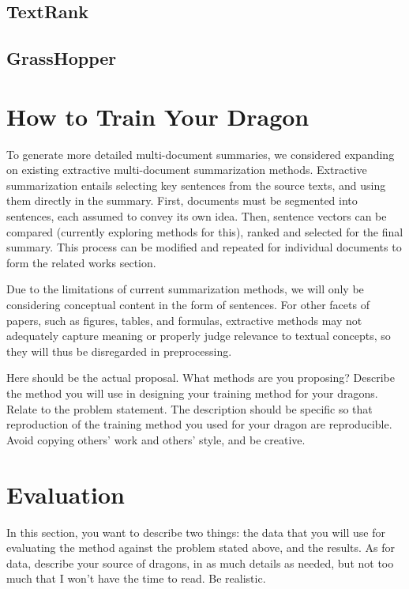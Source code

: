 \documentclass[conference]{sig-alternate-05-2015}
\begin{document}
\subsection{TextRank}

\subsection{GrassHopper}

\section{How to Train Your Dragon}\label{sec:design}



To generate more detailed multi-document summaries, we considered expanding on existing extractive multi-document summarization 
methods. Extractive summarization entails selecting key sentences from the source texts, and using them directly in the 
summary. First, documents must be segmented into sentences, each assumed to convey its own idea. Then, sentence vectors can be 
compared (currently exploring methods for this), ranked and selected for the final summary. This process can be modified 
and repeated for individual documents to form the related works section. 

Due to the limitations of current summarization methods, we will only be considering 
conceptual content in the form of sentences. For other facets of papers, such as figures, tables, and formulas, extractive 
methods may not adequately capture meaning or properly judge relevance to textual concepts, so they will thus be 
disregarded in preprocessing.

Here should be the actual proposal. What methods are you proposing? Describe the method you will use in designing your training method for your dragons. Relate to the problem statement. The description should be specific so that reproduction of the training method you used for your dragon are reproducible. Avoid copying others' work and others' style, and be creative. 

\section{Evaluation}\label{sec:evaluation}

In this section, you want to describe two things: the data that you will use for evaluating the method against the problem stated above, and the results. As for data, describe your source of dragons, in as much details as needed, but not too much that I won't have the time to read. Be realistic. 
\end{document}
